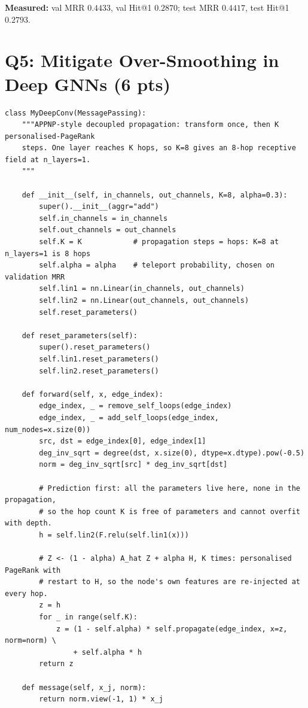 \medskip\noindent
\textbf{Measured:} val MRR $0.4433$, val Hit@1 $0.2870$; test MRR $0.4417$,
test Hit@1 $0.2793$.

\section*{Q5: Mitigate Over-Smoothing in Deep GNNs (6 pts)}

\begin{lstlisting}[style=p1pystyle]
class MyDeepConv(MessagePassing):
    """APPNP-style decoupled propagation: transform once, then K personalised-PageRank
    steps. One layer reaches K hops, so K=8 gives an 8-hop receptive field at n_layers=1.
    """

    def __init__(self, in_channels, out_channels, K=8, alpha=0.3):
        super().__init__(aggr="add")
        self.in_channels = in_channels
        self.out_channels = out_channels
        self.K = K            # propagation steps = hops: K=8 at n_layers=1 is 8 hops
        self.alpha = alpha    # teleport probability, chosen on validation MRR
        self.lin1 = nn.Linear(in_channels, out_channels)
        self.lin2 = nn.Linear(out_channels, out_channels)
        self.reset_parameters()

    def reset_parameters(self):
        super().reset_parameters()
        self.lin1.reset_parameters()
        self.lin2.reset_parameters()

    def forward(self, x, edge_index):
        edge_index, _ = remove_self_loops(edge_index)
        edge_index, _ = add_self_loops(edge_index, num_nodes=x.size(0))
        src, dst = edge_index[0], edge_index[1]
        deg_inv_sqrt = degree(dst, x.size(0), dtype=x.dtype).pow(-0.5)
        norm = deg_inv_sqrt[src] * deg_inv_sqrt[dst]

        # Prediction first: all the parameters live here, none in the propagation,
        # so the hop count K is free of parameters and cannot overfit with depth.
        h = self.lin2(F.relu(self.lin1(x)))

        # Z <- (1 - alpha) A_hat Z + alpha H, K times: personalised PageRank with
        # restart to H, so the node's own features are re-injected at every hop.
        z = h
        for _ in range(self.K):
            z = (1 - self.alpha) * self.propagate(edge_index, x=z, norm=norm) \
                + self.alpha * h
        return z

    def message(self, x_j, norm):
        return norm.view(-1, 1) * x_j
\end{lstlisting}

